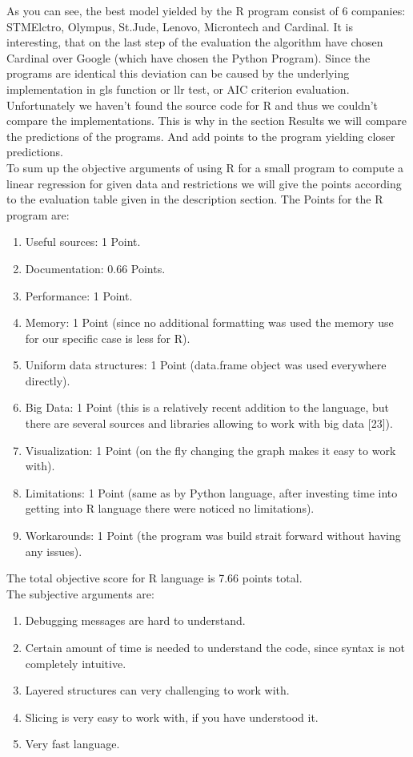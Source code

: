 \documentclass{article}
\begin{document}
As you can see, the best model yielded by the R program consist of 6 companies: STMElctro, Olympus, St.Jude, Lenovo, Microntech and Cardinal. It is interesting, that on the last step of the evaluation the algorithm have chosen Cardinal over Google (which have chosen the Python Program). Since the programs are identical this deviation can be caused by the underlying implementation in gls function or llr test, or AIC criterion evaluation. Unfortunately we haven't found the source code for R and thus we couldn't compare the implementations. This is why in the section Results we will compare the predictions of the programs. And add points to the program yielding closer predictions.\\
To sum up the objective arguments of using R for a small program to compute a linear regression for given data and restrictions we will give the points according to the evaluation table given in the description section. The Points for the R program are:
\begin{enumerate}
    \item Useful sources: 1 Point.
    \item Documentation: 0.66 Points.
    \item Performance: 1 Point.
    \item Memory: 1 Point (since no additional formatting was used the memory use for our specific case is less for R).
    \item Uniform data structures: 1 Point (data.frame object was used everywhere directly).
    \item Big Data: 1 Point (this is a relatively recent addition to the language, but there are several sources and libraries allowing to work with big data [23]).
    \item Visualization: 1 Point (on the fly changing the graph makes it easy to work with).
    \item Limitations: 1 Point (same as by Python language, after investing time into getting into R language there were noticed no limitations).
    \item Workarounds: 1 Point (the program was build strait forward without having any issues).
\end{enumerate} 
The total objective score for R language is 7.66 points total.\\
The subjective arguments are:
\begin{enumerate}
    \item Debugging messages are hard to understand.
    \item Certain amount of time is needed to understand the code, since syntax is not completely intuitive.
    \item Layered structures can very challenging to work with.
    \item Slicing is very easy to work with, if you have understood it.
    \item Very fast language.
\end{enumerate}
\end{document}
